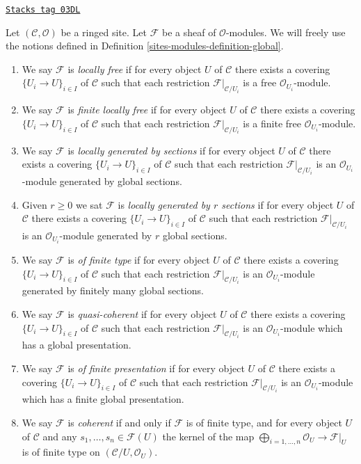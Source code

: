 \begin{definition}
\label{sites-modules-definition-site-local}
\href{https://stacks.math.columbia.edu/tag/03DL}{\texttt{Stacks tag 03DL}}

Let $(\mathcal{C}, \mathcal{O})$ be a ringed site.
Let $\mathcal{F}$ be a sheaf of $\mathcal{O}$-modules.
We will freely use the notions defined in
Definition \ref{sites-modules-definition-global}.
\begin{enumerate}
\item We say $\mathcal{F}$ is {\it locally free}
if for every object $U$ of $\mathcal{C}$ there exists a covering
$\{U_i \to U\}_{i \in I}$ of $\mathcal{C}$ such that each restriction
$\mathcal{F}|_{\mathcal{C}/U_i}$ is a free
$\mathcal{O}_{U_i}$-module.
\item We say $\mathcal{F}$ is {\it finite locally free}
if for every object $U$ of $\mathcal{C}$ there exists a covering
$\{U_i \to U\}_{i \in I}$ of $\mathcal{C}$ such that each restriction
$\mathcal{F}|_{\mathcal{C}/U_i}$ is a finite free
$\mathcal{O}_{U_i}$-module.
\item We say $\mathcal{F}$ is {\it locally generated by sections}
if for every object $U$ of $\mathcal{C}$ there exists a covering
$\{U_i \to U\}_{i \in I}$ of $\mathcal{C}$ such that each restriction
$\mathcal{F}|_{\mathcal{C}/U_i}$ is an
$\mathcal{O}_{U_i}$-module generated by global sections.
\item Given $r \geq 0$ we sat $\mathcal{F}$ is {\it locally generated
by $r$ sections} if for every object $U$ of $\mathcal{C}$ there exists
a covering $\{U_i \to U\}_{i \in I}$ of $\mathcal{C}$ such that each
restriction $\mathcal{F}|_{\mathcal{C}/U_i}$ is an
$\mathcal{O}_{U_i}$-module generated by $r$ global sections.
\item We say $\mathcal{F}$ is {\it of finite type}
if for every object $U$ of $\mathcal{C}$ there exists a covering
$\{U_i \to U\}_{i \in I}$ of $\mathcal{C}$ such that each restriction
$\mathcal{F}|_{\mathcal{C}/U_i}$ is an
$\mathcal{O}_{U_i}$-module generated by finitely many global sections.
\item We say $\mathcal{F}$ is {\it quasi-coherent}
if for every object $U$ of $\mathcal{C}$ there exists a covering
$\{U_i \to U\}_{i \in I}$ of $\mathcal{C}$ such that each restriction
$\mathcal{F}|_{\mathcal{C}/U_i}$ is an
$\mathcal{O}_{U_i}$-module which has a global presentation.
\item We say $\mathcal{F}$ is {\it of finite presentation}
if for every object $U$ of $\mathcal{C}$ there exists a covering
$\{U_i \to U\}_{i \in I}$ of $\mathcal{C}$ such that each restriction
$\mathcal{F}|_{\mathcal{C}/U_i}$ is an
$\mathcal{O}_{U_i}$-module which has a finite global presentation.
\item We say $\mathcal{F}$ is {\it coherent} if and only if
$\mathcal{F}$ is of finite type, and for every object
$U$ of $\mathcal{C}$ and any $s_1, \ldots, s_n \in \mathcal{F}(U)$
the kernel of the map
$\bigoplus_{i = 1, \ldots, n} \mathcal{O}_U \to \mathcal{F}|_U$
is of finite type on $(\mathcal{C}/U, \mathcal{O}_U)$.
\end{enumerate}
\end{definition}

